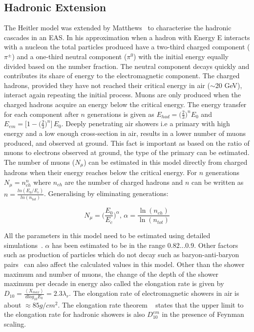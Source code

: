 \subsection*{Hadronic Extension}
\label{sec:Dev_Had}
The Heitler model was extended by Matthews~\cite{MATTHEWS2005387} to characterise the hadronic cascades in an EAS. In his approximation when a hadron with Energy E interacts with a nucleon the total particles produced have a two-third charged component ($\pi^\pm $) and a one-third neutral component ($\pi^0$) with the initial energy equally divided based on the number fraction. The neutral component decays quickly and contributes its share of energy to the electromagnetic component. The charged hadrons, provided they have not reached their critical energy in air ($\sim$20 GeV), interact again repeating the initial process. Muons are only produced when the charged hadrons acquire an energy below the critical energy. The energy transfer for each component after $n$ generations is given as $E_{had} = \biggl(\frac{2}{3}\biggr)^n E_0$ and $E_{em} = \big[1- \biggl(  \frac{2}{3}\biggr)^n\big] \, E_0$. Deeply penetrating air showers i.e a primary with high energy and a low enough cross-section in air, results in a lower number of muons produced, and observed at ground. This fact is important as based on the ratio of muons to electrons observed at ground, the type of the primary can be estimated. The number of muons ($N_{\mu}$) can be estimated in this model directly from charged hadrons when their energy reaches below the critical energy. For $n$ generations $N_{\mu} = n_{ch}^n$ where $n_{ch}$ are the number of charged hadrons and $n$ can be written as $n = \frac{ln(E_0/E_c)}{ln(n_{tot})}$. Generalising by eliminating generations:

\begin{equation}
    N_{\mu} = \biggl(\frac{E_0}{E_c}\biggr)^{\alpha} , \, \alpha = \frac{\ln (n_{ch})}{\ln (n_{tot})}
\end{equation}

All the parameters in this model need to be estimated using detailed simulations~\cite{PhysRevD.66.033011}. $\alpha$ has been estimated to be in the range 0.82...0.9. Other factors such as production of particles which do not decay such as baryon-anti-baryon pairs~\cite{Pierog:2006qv} can also affect the calculated values in this model. Other than the shower maximum and number of muons, the change of the depth of the shower maximum per decade in energy also called the elongation rate is given by $D_{10} = \frac{\left\langle X_{max}\right\rangle }{dlog_{10}E_0} = 2.3\lambda_r$. The elongation rate of electromagnetic showers in air is about $\approx 85g/cm^2$. The elongation rate theorem ~\cite{Linsley_1977} states that the upper limit to the elongation rate for hadronic showers is also $D_{10}^{em}$ in the presence of Feynman scaling.

